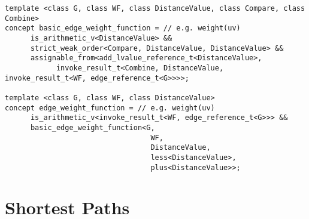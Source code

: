 
\begin{lstlisting}
template <class G, class WF, class DistanceValue, class Compare, class Combine>
concept basic_edge_weight_function = // e.g. weight(uv)
      is_arithmetic_v<DistanceValue> && 
      strict_weak_order<Compare, DistanceValue, DistanceValue> &&
      assignable_from<add_lvalue_reference_t<DistanceValue>,
            invoke_result_t<Combine, DistanceValue, invoke_result_t<WF, edge_reference_t<G>>>>;

template <class G, class WF, class DistanceValue>
concept edge_weight_function = // e.g. weight(uv)
      is_arithmetic_v<invoke_result_t<WF, edge_reference_t<G>>> &&
      basic_edge_weight_function<G,
                                  WF,
                                  DistanceValue,
                                  less<DistanceValue>,
                                  plus<DistanceValue>>;
\end{lstlisting}

\begin{comment}
      \phil{Queueable isn't being used.}
      \begin{lstlisting}
      // queueableQ can represent std::queue and std::priority\_queue
      template <class Q>
      concept queueable = requires(Q&& q, Q::value_type value) {
      Q::value_type;
      Q::size_type;
      Q::reference;

      {q.top()};
      {q.push(value)};
      {q.pop()};
      {q.empty()};
      {q.size()};
      };
      \end{lstlisting}
\end{comment}



\section{Shortest Paths}




